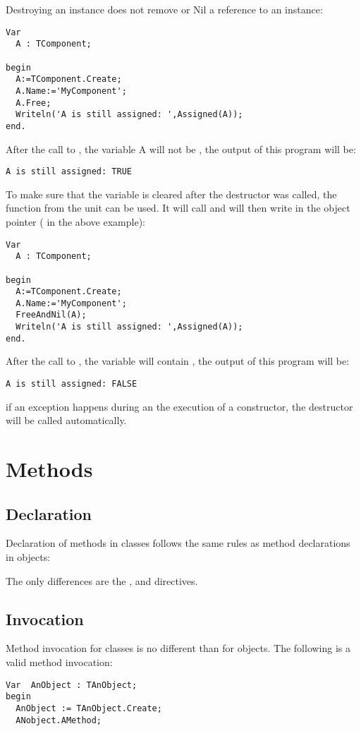 Destroying an instance does not remove or Nil a reference to an instance:
\begin{verbatim}
Var
  A : TComponent;

begin
  A:=TComponent.Create;
  A.Name:='MyComponent';
  A.Free;
  Writeln('A is still assigned: ',Assigned(A));
end.
\end{verbatim}
After the call to , the variable A will not be , the
output of this program will be:
\begin{verbatim}
A is still assigned: TRUE
\end{verbatim}
To make sure that the variable  is cleared after the destructor was called,
the function  from the  unit can be used. It
will call  and will then write  in the object pointer (
in the above example):
\begin{verbatim}
Var
  A : TComponent;

begin
  A:=TComponent.Create; 
  A.Name:='MyComponent';
  FreeAndNil(A);
  Writeln('A is still assigned: ',Assigned(A));
end.
\end{verbatim}
After the call to , the variable  will contain , the
output of this program will be:
\begin{verbatim}
A is still assigned: FALSE
\end{verbatim}

\begin{remark}
if an exception happens during an the execution of a constructor, 
the destructor will be called automatically.
\end{remark}

\section{Methods}
\subsection{Declaration}
Declaration of methods in classes follows the same rules as method
declarations in objects:

The only differences are the ,  and
 directives.

\subsection{Invocation}
Method invocation for classes is no different than for objects. The
following is a valid method invocation:
\begin{verbatim}
Var  AnObject : TAnObject;
begin
  AnObject := TAnObject.Create;
  ANobject.AMethod;
\end{verbatim}


